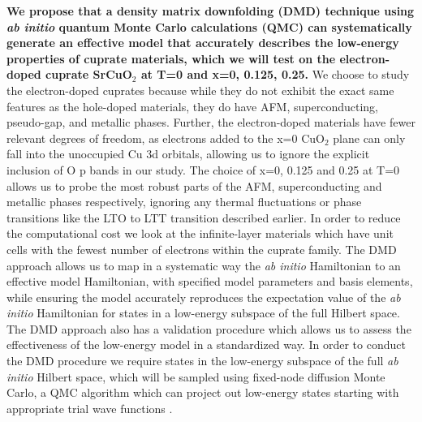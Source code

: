 \documentclass{article}
\begin{document}
\textbf{We propose that a density matrix downfolding (DMD) \cite{10.3389/fphy.2018.00043, doi:10.1063/1.4927664} technique using \textit{ab initio} quantum Monte Carlo calculations (QMC) can systematically generate an effective model that accurately describes the low-energy properties of cuprate materials, which we will test on the electron-doped cuprate SrCuO$_2$ at T=0 and x=0, 0.125, 0.25. }
We choose to study the electron-doped cuprates because while they do not exhibit the exact same features as the hole-doped materials, they do have AFM,  superconducting, pseudo-gap, and metallic phases.
Further, the electron-doped materials have fewer relevant degrees of freedom, as electrons added to the x=0 CuO$_2$ plane can only fall into the unoccupied Cu 3d orbitals, allowing us to ignore the explicit inclusion of O p bands in our study. 
The choice of x=0, 0.125 and 0.25 at T=0 allows us to probe the most robust parts of the AFM, superconducting and metallic phases respectively, ignoring any thermal fluctuations or phase transitions like the LTO to LTT transition described earlier. 
In order to reduce the computational cost we look at the infinite-layer materials which have unit cells with the fewest number of electrons within the cuprate family.
The DMD approach allows us to map in a systematic way the \textit{ab initio} Hamiltonian to an effective model Hamiltonian, with specified model parameters and basis elements, while ensuring the model accurately reproduces the expectation value of the \textit{ab initio} Hamiltonian for states in a low-energy subspace of the full Hilbert space. 
The DMD approach also has a validation procedure which allows us to assess the effectiveness of the low-energy model in a standardized way.
In order to conduct the DMD procedure we require states in the low-energy subspace of the full \textit{ab initio} Hilbert space, which will be sampled using fixed-node diffusion Monte Carlo, a QMC algorithm which can project out low-energy states starting with appropriate trial wave functions \cite{RevModPhys.73.33}.
 
\end{document}
